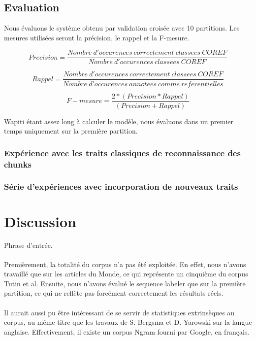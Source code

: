 \documentclass[a4paper,12pt]{article}
\begin{document}
\subsection{Evaluation}

Nous évaluons le système obtenu par validation croisée avec 10 partitions. Les mesures utilisées seront la précision, le rappel et la F-mesure.

\[ Precision = \frac{Nombre\ d'occurences\ correctement\ classees\ COREF}{Nombre\ d'occurences\ classees\ COREF} \]

\[ Rappel = \frac{Nombre\ d'occurences\ correctement\ classees\ COREF}{Nombre\ d'occurences\ annotees\ comme\ referentielles} \]

\[ F-mesure = \frac{2 * (Precision * Rappel)}{(Precision + Rappel)} \]

Wapiti étant assez long à calculer le modèle, nous évaluons dans un premier temps uniquement sur la première partition.

\subsubsection{Expérience avec les traits classiques de reconnaissance des chunks}

\subsubsection{Série d'expériences avec incorporation de nouveaux traits}

\section{Discussion}

Phrase d'entrée.

\paragraph{}
Premièrement, la totalité du corpus n'a pas été exploitée. En effet, nous n'avons travaillé que sur les articles du Monde, ce qui représente un cinquième du corpus Tutin et al. Ensuite, nous n'avons évalué le sequence labeler que sur la première partition, ce qui ne reflète pas forcément correctement les résultats réels.

\paragraph{}
Il aurait aussi pu être intéressant de se servir de statistiques extrinsèques au corpus, au même titre que les travaux de S. Bergsma et D. Yarowski sur la langue anglaise. Effectivement, il existe un corpus Ngram fourni par Google, en français.
\end{document}
